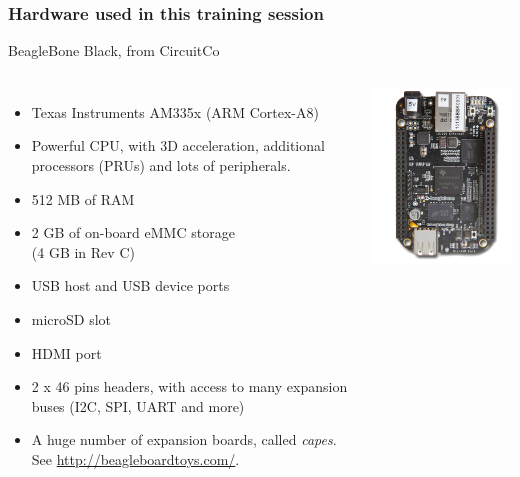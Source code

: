 \begin{frame}
\frametitle{Hardware used in this training session}
  BeagleBone Black, from CircuitCo
  \begin{columns}
    \footnotesize
    \begin{itemize}
      \item Texas Instruments AM335x (ARM Cortex-A8)
      \item Powerful CPU, with 3D acceleration, additional processors
        (PRUs) and lots of peripherals.
      \item 512 MB of RAM
      \item 2 GB of on-board eMMC storage\\
            (4 GB in Rev C)
      \item USB host and USB device ports
      \item microSD slot
      \item HDMI port
      \item 2 x 46 pins headers, with access to many expansion buses
        (I2C, SPI, UART and more)
      \item A huge number of expansion boards, called {\em capes}.
        See \url{http://beagleboardtoys.com/}.
    \end{itemize}
    \includegraphics[width=\textwidth]{slides/beagleboneblack-board/beagleboneblack.png}
  \end{columns}
\end{frame}
